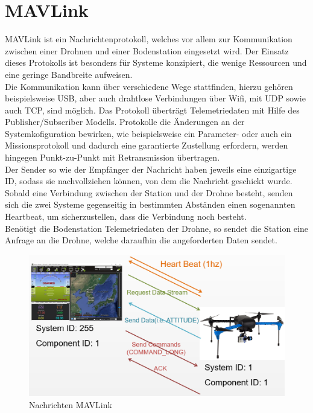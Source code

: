\section{MAVLink} \label{mavlink}
\ac{MAVLink} ist ein Nachrichtenprotokoll, welches vor allem zur Kommunikation zwischen einer Drohnen und einer Bodenstation eingesetzt wird. Der Einsatz dieses Protokolls ist besonders für Systeme konzipiert, die wenige Ressourcen und eine geringe Bandbreite aufweisen.\\
Die Kommunikation kann über verschiedene Wege stattfinden, hierzu gehören beispielsweise \ac{USB}, aber auch drahtlose Verbindungen über Wifi, mit \ac{UDP} sowie auch \ac{TCP}, sind möglich. Das Protokoll überträgt Telemetriedaten mit Hilfe des Publisher/Subscriber Modells. Protokolle die Änderungen an der Systemkofiguration bewirken, wie beispielsweise ein Parameter- oder auch ein Missionsprotokoll und dadurch eine garantierte Zustellung erfordern, werden hingegen Punkt-zu-Punkt mit Retransmission übertragen. 
\\
Der Sender so wie der Empfänger der Nachricht haben jeweils eine einzigartige ID, sodass sie nachvollziehen können, von dem die Nachricht geschickt wurde. Sobald eine Verbindung zwischen der Station und der Drohne besteht, senden sich die zwei Systeme gegenseitig in bestimmten Abständen einen sogenannten Heartbeat, um sicherzustellen, dass die Verbindung noch besteht.
\\
Benötigt die Bodenstation Telemetriedaten der Drohne, so sendet die Station eine Anfrage an die Drohne, welche daraufhin die angeforderten Daten sendet. \cite{mavlink}

\begin{figure}[H]
    \begin{centering}
        \includegraphics[scale=0.4]{images/mavlink-message-flow.png}
        \caption{\label{img mavlink}Nachrichten MAVLink \cite{imgmavlink}}
    \end{centering}
\end{figure}


